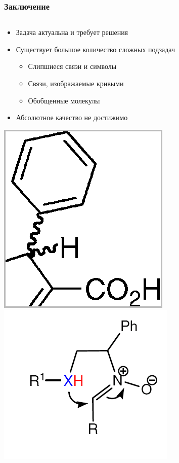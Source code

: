 \begin{frame}
  \frametitle{Заключение}
  \begin{columns}
    \begin{column}{0.7\textwidth}
  \begin{itemize}
    \item Задача актуальна и требует решения
    \item Существует большое количество сложных подзадач
      \begin{itemize}
        \item Слипшиеся связи и символы
        \item Связи, изображаемые кривыми
        \item Обобщенные молекулы
      \end{itemize}
    \item Абсолютное качество не достижимо
  \end{itemize}
\centering  \includegraphics[scale=0.2]{media/complex3.png} 
  \includegraphics[scale=0.5]{media/complex.png}

\end{column}
\end{columns}
\end{frame}
